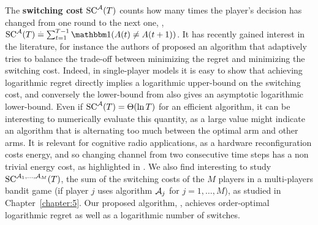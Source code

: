 
The \textbf{switching cost} $\mathrm{SC}^{\mathcal{A}}(T)$ counts how many times the player's decision has changed from one round to the next one, \ie, $\mathrm{SC}^{\cA}(T) \eqdef \sum_{t=1}^{T-1} \indic(A(t) \neq A(t+1))$.
It has recently gained interest in the literature, for instance the authors of \cite{Koren17} proposed an algorithm that adaptively tries to balance the trade-off between minimizing the regret and minimizing the switching cost.
%
Indeed, in single-player models it is easy to show that achieving logarithmic regret directly implies a logarithmic upper-bound on the switching cost, and conversely the lower-bound from \cite{LaiRobbins85} also gives an asymptotic logarithmic lower-bound.
Even if $\mathrm{SC}^{\mathcal{A}}(T) = \Theta(\ln T)$ for an efficient algorithm, it can be interesting to numerically evaluate this quantity, as a large value might indicate an algorithm that is alternating too much between the optimal arm and other arms.
%
It is relevant for cognitive radio applications, as a hardware reconfiguration costs energy, and so changing channel from two consecutive time steps has a non trivial energy cost, as highlighted in \cite{modiDemo2016}.
We also find interesting to study $\mathrm{SC}^{\mathcal{A}_1,\dots,\mathcal{A}_M}(T)$, the sum of the switching costs of the $M$ players in a multi-players bandit game (if player $j$ uses algorithm $\mathcal{A}_j$ for $j=1,\dots,M$), as studied in Chapter~\ref{chapter:5}.
Our proposed algorithm, \MCTopM, achieves order-optimal logarithmic regret as well as a logarithmic number of switches.
